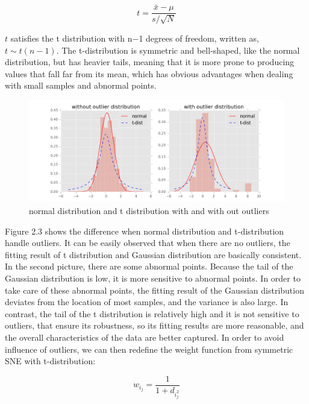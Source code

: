 \begin{equation*}
    {t} =  \frac {\bar{x} - \mu}{s / \sqrt{N}} 
\end{equation*}

\noindent $t$ satisfies the t distribution with n−1 degrees of freedom, written as, $t∼t(n−1)$. The t-distribution is symmetric and bell-shaped, like the normal distribution, but has heavier tails, meaning that it is more prone to producing values that fall far from its mean, which has obvious advantages when dealing with small samples and abnormal points.\\

\begin{figure}[ht]

\centering
\includegraphics[scale=0.6]{images/image_t-distribution.png}
\caption{normal distribution and t distribution with and with out outliers}
\label{fig:label}
\end{figure}

\noindent Figure 2.3 shows the difference when normal distribution and t-distribution handle outliers. It can be easily observed that when there are no outliers, the fitting result of t distribution and Gaussian distribution are basically consistent. In the second picture, there are some abnormal points. Because the tail of the Gaussian distribution is low, it is more sensitive to abnormal points. In order to take care of these abnormal points, the fitting result of the Gaussian distribution deviates from the location of most samples, and the variance is also large. In contrast, the tail of the t distribution is relatively high and it is not sensitive to outliers, that ensure its robustness, so its fitting results are more reasonable, and the overall characteristics of the data are better captured. In order to avoid influence of outliers, we can then redefine the weight function from symmetric SNE with t-distribution: 

\begin{equation*}
    {w_i_j} =  \frac {1}{1+d_i_j^2} 
\end{equation*}

